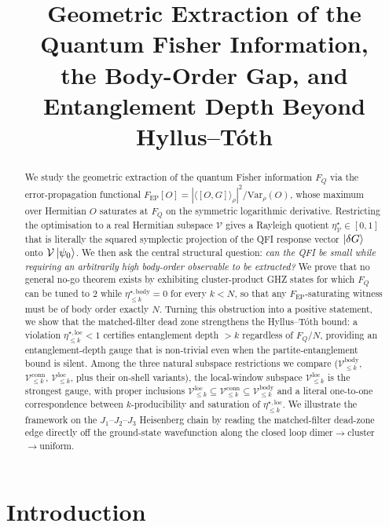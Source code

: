 \documentclass[11pt,a4paper]{article}
\title{Geometric Extraction of the Quantum Fisher Information,\\
the Body-Order Gap, and Entanglement Depth Beyond
Hyllus--T\'oth}
\author{}
\date{}
\newcommand{\FQ}{F_Q}
\newcommand{\FEP}{F_{\mathrm{EP}}}
\newcommand{\Var}{\mathrm{Var}}
\newcommand{\PsiZ}{\ket{\psi_0}}
\newcommand{\dG}{\ket{\delta G}}
\newcommand{\Vbody}[1]{\mathcal{V}^{\mathrm{body}}_{\le #1}}
\newcommand{\Vconn}[1]{\mathcal{V}^{\mathrm{conn}}_{\le #1}}
\newcommand{\Vloc}[1]{\mathcal{V}^{\mathrm{loc}}_{\le #1}}
\newcommand{\etabody}[1]{\eta^{\star,\mathrm{body}}_{\le #1}}
\newcommand{\etaloc}[1]{\eta^{\star,\mathrm{loc}}_{\le #1}}
\begin{document}
\maketitle

\begin{abstract}
We study the geometric extraction of the quantum Fisher information
$\FQ$ via the error-propagation functional
$\FEP[O]=|\langle[O,G]\rangle_\rho|^2/\Var_\rho(O)$, whose maximum
over Hermitian $O$ saturates at $\FQ$ on the symmetric logarithmic
derivative.  Restricting the optimisation to a real Hermitian
subspace $\mathcal V$ gives a Rayleigh quotient
$\eta^\star_{\mathcal V}\in[0,1]$ that is literally the squared
symplectic projection of the QFI response vector $\dG$ onto
$\mathcal V\PsiZ$.  We then ask the central structural question:
\emph{can the QFI be small while requiring an arbitrarily high
body-order observable to be extracted?}  We prove that no general
no-go theorem exists by exhibiting cluster-product GHZ states for
which $\FQ$ can be tuned to $2$ while $\etabody{k}=0$ for every
$k<N$, so that any $\FEP$-saturating witness must be of body order
exactly $N$.  Turning this obstruction into a positive statement,
we show that the matched-filter dead zone strengthens the
Hyllus--T\'oth bound: a violation
$\etaloc{k}<1$ certifies entanglement depth $>k$ regardless of
$\FQ/N$, providing an entanglement-depth gauge that is non-trivial
even when the partite-entanglement bound is silent.  Among the
three natural subspace restrictions we compare ($\Vbody{k}$,
$\Vconn{k}$, $\Vloc{k}$, plus their on-shell variants), the
local-window subspace $\Vloc{k}$ is the strongest gauge, with
proper inclusions $\Vloc{k}\subseteq\Vconn{k}\subseteq\Vbody{k}$
and a literal one-to-one correspondence between $k$-producibility
and saturation of $\etaloc{k}$.  We illustrate the framework on
the $J_1$--$J_2$--$J_3$ Heisenberg chain by reading the
matched-filter dead-zone edge directly off the ground-state
wavefunction along the closed loop dimer$\to$cluster$\to$uniform.
\end{abstract}

\tableofcontents

\section{Introduction}
\label{sec:intro}
\end{document}
